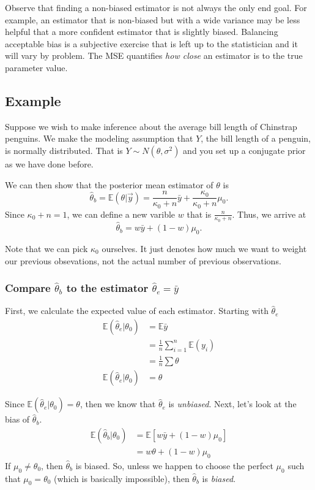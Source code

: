 \documentclass[titlepage, 12pt, leqno]{article}
\begin{document}
Observe that finding a non-biased estimator is not always the only end goal. For example,
an estimator that is non-biased but with a wide variance may be less helpful that a 
more confident estimator that is slightly biased. Balancing acceptable bias is a
subjective exercise that is left up to the statistician and it will vary by problem. The
MSE quantifies \textit{how close} an estimator is to the true parameter value.

\subsection{Example}
Suppose we wish to make inference about the average bill length of Chinstrap penguins. We
make the modeling assumption that $Y$, the bill length of a penguin, is normally 
distributed. That is $Y \sim N(\theta,\sigma^{2})$ and you set up a conjugate prior as we
have done before. 

We can then show that the posterior mean estimator of $\theta$ is
\[
\hat \theta_{b} = \mathbb{E}(\theta|\vec y) = \frac{n}{\kappa_{0}+n}\bar y +
\frac{\kappa_{0}}{\kappa_{0}+n}\mu_{0}.
\]
Since $\kappa_{0}+n=1$, we can define a new varible $w$ that is $\frac{n}{\kappa_{0}+n}$.
Thus, we arrive at
\[
\hat \theta_{b}=w\bar y+(1-w)\mu_{0}.
\]
\begin{note}
    Note that we can pick $\kappa_{0}$ ourselves. It just denotes how much we want to
    weight our previous obsevations, not the actual number of previous observations.
\end{note}

\subsubsection{Compare $\hat \theta_{b}$ to the estimator $\hat \theta_{e}=\bar y$}
First, we calculate the expected value of each estimator. Starting with $\hat \theta_{e}$
\begin{align*}
    \mathbb{E}(\hat \theta_{e}|\theta_{0}) &= \mathbb{E}\bar y\\
                                           &=\frac{1}{n}\sum_{i=1}^{n} 
                                           \mathbb{E}(y_{i})\\
                                           &= \frac{1}{n}\sum\theta\\
    \mathbb{E}(\hat \theta_{e}|\theta_{0}) &= \theta
\end{align*}

Since $ \mathbb{E}(\hat \theta_{e}|\theta_{0}) = \theta$, then we know that $\hat \theta
_{e}$ is \textit{unbiased}. Next, let's look at the bias of $\hat \theta_{b}$.
\begin{align*}
    \mathbb{E}(\hat \theta_{b}|\theta_{0}) &= \mathbb{E}[w\bar y+(1-w)\mu_{0}] \\
                                           &= w\theta+(1-w)\mu_{0}
\end{align*}
If $\mu_{0} \ne \theta_{0}$, then $\hat \theta_{b}$ is biased. So, unless we happen to
choose the perfect $\mu_{0}$ such that $\mu_{0}=\theta_{0}$ (which is basically
impossible), then $\hat \theta_{b}$ is \textit{biased}.
\end{document}

